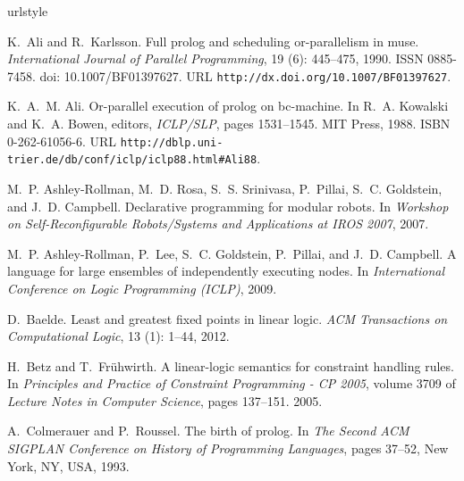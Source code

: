 \documentclass{sigplanconf}
\begin{document}
\begin{thebibliography}{35}
\providecommand{\natexlab}[1]{#1}
\providecommand{\url}[1]{\texttt{#1}}
\expandafter\ifx\csname urlstyle\endcsname\relax
  \providecommand{\doi}[1]{doi: #1}\else
  \providecommand{\doi}{doi: \begingroup \urlstyle{rm}\Url}\fi

K.~Ali and R.~Karlsson.
\newblock Full prolog and scheduling or-parallelism in muse.
\newblock \emph{International Journal of Parallel Programming}, 19
  (6): 445--475, 1990.
\newblock ISSN 0885-7458.
\newblock \doi{10.1007/BF01397627}.
\newblock URL \url{http://dx.doi.org/10.1007/BF01397627}.

K.~A.~M. Ali.
\newblock Or-parallel execution of prolog on bc-machine.
\newblock In R.~A. Kowalski and K.~A. Bowen, editors, \emph{ICLP/SLP}, pages
  1531--1545. MIT Press, 1988.
\newblock ISBN 0-262-61056-6.
\newblock URL \url{http://dblp.uni-trier.de/db/conf/iclp/iclp88.html#Ali88}.

M.~P. Ashley-Rollman, M.~D. Rosa, S.~S. Srinivasa, P.~Pillai, S.~C. Goldstein,
  and J.~D. Campbell.
\newblock Declarative programming for modular robots.
\newblock In \emph{Workshop on Self-Reconfigurable Robots/Systems and
  Applications at IROS 2007}, 2007.

M.~P. Ashley-Rollman, P.~Lee, S.~C. Goldstein, P.~Pillai, and J.~D. Campbell.
\newblock A language for large ensembles of independently executing nodes.
\newblock In \emph{International Conference on Logic Programming (ICLP)}, 2009.

D.~Baelde.
\newblock Least and greatest fixed points in linear logic.
\newblock \emph{ACM Transactions on Computational Logic}, 13
  (1): 1--44, 2012.

H.~Betz and T.~Fr{\"u}hwirth.
\newblock A linear-logic semantics for constraint handling rules.
\newblock In \emph{Principles and Practice of Constraint Programming - CP
  2005}, volume 3709 of \emph{Lecture Notes in Computer Science}, pages
  137--151. 2005.

A.~Colmerauer and P.~Roussel.
\newblock The birth of prolog.
\newblock In \emph{The Second ACM SIGPLAN Conference on History of Programming
  Languages}, pages 37--52, New York, NY, USA, 1993.


\end{thebibliography}
\end{document}
